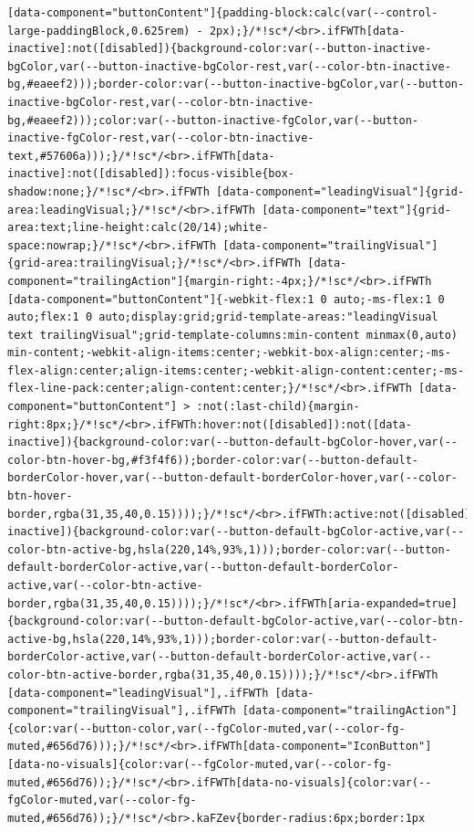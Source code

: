 \documentclass[
  letterpaper,
]{book}
\begin{document}
\begin{verbatim}
[data-component="buttonContent"]{padding-block:calc(var(--control-large-paddingBlock,0.625rem) - 2px);}/*!sc*/<br>.ifFWTh[data-inactive]:not([disabled]){background-color:var(--button-inactive-bgColor,var(--button-inactive-bgColor-rest,var(--color-btn-inactive-bg,#eaeef2)));border-color:var(--button-inactive-bgColor,var(--button-inactive-bgColor-rest,var(--color-btn-inactive-bg,#eaeef2)));color:var(--button-inactive-fgColor,var(--button-inactive-fgColor-rest,var(--color-btn-inactive-text,#57606a)));}/*!sc*/<br>.ifFWTh[data-inactive]:not([disabled]):focus-visible{box-shadow:none;}/*!sc*/<br>.ifFWTh [data-component="leadingVisual"]{grid-area:leadingVisual;}/*!sc*/<br>.ifFWTh [data-component="text"]{grid-area:text;line-height:calc(20/14);white-space:nowrap;}/*!sc*/<br>.ifFWTh [data-component="trailingVisual"]{grid-area:trailingVisual;}/*!sc*/<br>.ifFWTh [data-component="trailingAction"]{margin-right:-4px;}/*!sc*/<br>.ifFWTh [data-component="buttonContent"]{-webkit-flex:1 0 auto;-ms-flex:1 0 auto;flex:1 0 auto;display:grid;grid-template-areas:"leadingVisual text trailingVisual";grid-template-columns:min-content minmax(0,auto) min-content;-webkit-align-items:center;-webkit-box-align:center;-ms-flex-align:center;align-items:center;-webkit-align-content:center;-ms-flex-line-pack:center;align-content:center;}/*!sc*/<br>.ifFWTh [data-component="buttonContent"] > :not(:last-child){margin-right:8px;}/*!sc*/<br>.ifFWTh:hover:not([disabled]):not([data-inactive]){background-color:var(--button-default-bgColor-hover,var(--color-btn-hover-bg,#f3f4f6));border-color:var(--button-default-borderColor-hover,var(--button-default-borderColor-hover,var(--color-btn-hover-border,rgba(31,35,40,0.15))));}/*!sc*/<br>.ifFWTh:active:not([disabled]):not([data-inactive]){background-color:var(--button-default-bgColor-active,var(--color-btn-active-bg,hsla(220,14%,93%,1)));border-color:var(--button-default-borderColor-active,var(--button-default-borderColor-active,var(--color-btn-active-border,rgba(31,35,40,0.15))));}/*!sc*/<br>.ifFWTh[aria-expanded=true]{background-color:var(--button-default-bgColor-active,var(--color-btn-active-bg,hsla(220,14%,93%,1)));border-color:var(--button-default-borderColor-active,var(--button-default-borderColor-active,var(--color-btn-active-border,rgba(31,35,40,0.15))));}/*!sc*/<br>.ifFWTh [data-component="leadingVisual"],.ifFWTh [data-component="trailingVisual"],.ifFWTh [data-component="trailingAction"]{color:var(--button-color,var(--fgColor-muted,var(--color-fg-muted,#656d76)));}/*!sc*/<br>.ifFWTh[data-component="IconButton"][data-no-visuals]{color:var(--fgColor-muted,var(--color-fg-muted,#656d76));}/*!sc*/<br>.ifFWTh[data-no-visuals]{color:var(--fgColor-muted,var(--color-fg-muted,#656d76));}/*!sc*/<br>.kaFZev{border-radius:6px;border:1px 
\end{verbatim}
\end{document}
